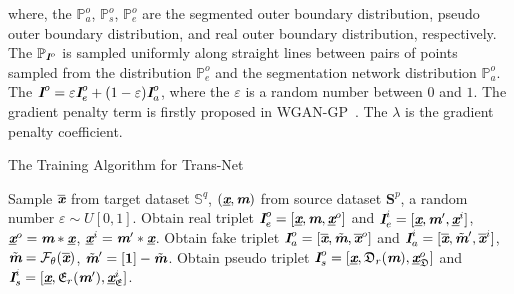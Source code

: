 \documentclass[letterpaper]{article} %
\begin{document}
where, the $ \mathbb{P}^o_a$, $\mathbb{P}^o_s$, $\mathbb{P}^o_e$ are the segmented outer boundary distribution, pseudo outer boundary distribution, and real outer boundary distribution, respectively.
The $\mathbb{P}_{\textbf{\em I}^o}$ is sampled uniformly along straight lines between pairs of points sampled from the distribution $\mathbb{P}^o_e$ and the segmentation network distribution $ \mathbb{P}^o_a$.
The $\textbf{\em I}^o=\varepsilon \textbf{\em I}^o_e+(1-\varepsilon)\textbf{\em I}^o_a$, where the $\varepsilon$ is a random number between $0$ and $1$.
The gradient penalty term is firstly proposed in WGAN-GP~\cite{gulrajani2017improved}. The $\lambda$ is the gradient penalty coefficient.


\begin{algorithm}[!th]
\caption{The Training Algorithm for Trans-Net}
\begin{algorithmic}[1]
\renewcommand{\algorithmicrequire}{\textbf{Require:}}
\renewcommand{\algorithmicensure}{\textbf{Require:}}
\State Sample $\overline{\textbf{\em x}}$ from target dataset $\mathbb{S}^q$, $(\underline{\textbf{\em x}},\textbf{\em m})$ from source dataset $\mathbf{S}^p$, a random number $\varepsilon \sim U[0,1]$.
\State Obtain real triplet $\textbf{\em I}^o_e=[\underline{\textbf{\em x}},\textbf{\em m},\underline{\textbf{\em x}}^o]$ and $\textbf{\em I}^i_e=[\underline{\textbf{\em x}},\textbf{\em m}',\underline{\textbf{\em x}}^i]$, $\underline{\textbf{\em x}}^o=\textbf{\em m}*\underline{\textbf{\em x}}$, $\underline{\textbf{\em x}}^i=\textbf{\em m}'*\underline{\textbf{\em x}}$.
\State Obtain fake triplet $\textbf{\em I}^o_a=[\overline{\textbf{\em x}},\tilde{\textbf{\em m}},\overline{\textbf{\em x}}^o]$ and $\textbf{\em I}^i_a=[\overline{\textbf{\em x}},\tilde{\textbf{\em m}}',\overline{\textbf{\em x}}^i]$, $\tilde{\textbf{\em m}}=\mathcal{F}_{\theta}(\overline{\textbf{\em x}})$, $\tilde{\textbf{\em m}}'=[\mathbf{1}]-\tilde{\textbf{\em m}}$.
\State Obtain pseudo triplet $\textbf{\em I}^o_s=[\underline{\textbf{\em x}},\mathfrak{D}_r(\textbf{\em m}),\underline{\textbf{\em x}}^o_{\mathfrak{D}}]$ and $\textbf{\em I}^i_s=[\underline{\textbf{\em x}},\mathfrak{E}_r(\textbf{\em m}'),\underline{\textbf{\em x}}^i_{\mathfrak{E}}]$.

\end{algorithmic}
\end{algorithm}
\end{document}
